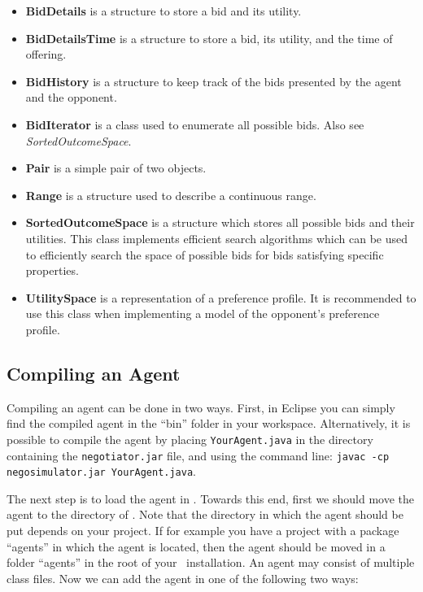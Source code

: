 \documentclass[]{article}
\begin{document}
\begin{itemize}

\item \textbf{BidDetails} is a structure to store a bid and its utility.
\item \textbf{BidDetailsTime} is a structure to store a bid, its utility, and the time of offering.
\item \textbf{BidHistory} is a structure to keep track of the bids presented by the agent and the opponent.
\item \textbf{BidIterator} is a class used to enumerate all possible bids. Also see \textit{SortedOutcomeSpace}.
\item \textbf{Pair} is a simple pair of two objects.
\item \textbf{Range} is a structure used to describe a continuous range.
\item \textbf{SortedOutcomeSpace} is a structure which stores all possible bids and their utilities. This class implements efficient search algorithms which can be used to efficiently search the space of possible bids for bids satisfying specific properties.
\item \textbf{UtilitySpace} is a representation of a preference profile. It is recommended to use this class when implementing a model of the opponent's preference profile.
\end{itemize}

\subsection{Compiling an Agent}
Compiling an agent can be done in two ways. First, in Eclipse you can simply find the compiled agent in the ``bin'' folder in your workspace. Alternatively, it is possible to compile the agent by placing \texttt{YourAgent.java} in the directory containing the \texttt{negotiator.jar} file, and using the command line: \texttt{javac -cp negosimulator.jar YourAgent.java}.

The next step is to load the agent in \Genius. Towards this end, first we should move the agent to the directory of \Genius. Note that the directory in which the agent should be put depends on your project. If for example you have a project with a package ``agents'' in which the agent is located, then the agent should be moved in a folder ``agents'' in the root of your \Genius~installation. An agent may consist of multiple class files. Now we can add the agent in one of the following two ways:
\end{document}
